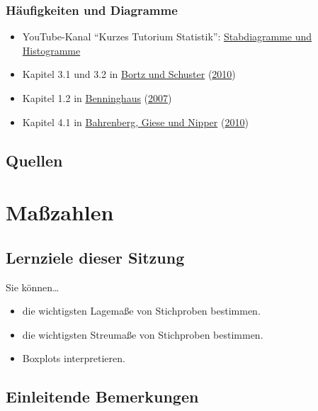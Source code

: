 \documentclass[
  ngerman,
]{article}
\providecommand{\tightlist}{%
  \setlength{\itemsep}{0pt}\setlength{\parskip}{0pt}}
\begin{document}
\hypertarget{huxe4ufigkeiten-und-diagramme}{%
\subsubsection{Häufigkeiten und Diagramme}\label{huxe4ufigkeiten-und-diagramme}}

\begin{itemize}
\tightlist
\item
  YouTube-Kanal ``Kurzes Tutorium Statistik'': \href{https://www.youtube.com/watch?v=LkOBRWXnTRQ}{Stabdiagramme und Histogramme}
\item
  Kapitel 3.1 und 3.2 in \protect\hyperlink{ref-bortz}{Bortz und Schuster} (\protect\hyperlink{ref-bortz}{2010})
\item
  Kapitel 1.2 in \protect\hyperlink{ref-benninghaus}{Benninghaus} (\protect\hyperlink{ref-benninghaus}{2007})
\item
  Kapitel 4.1 in \protect\hyperlink{ref-bahrenberg}{Bahrenberg, Giese und Nipper} (\protect\hyperlink{ref-bahrenberg}{2010})
\end{itemize}

\hypertarget{quellen}{%
\subsection{Quellen}\label{quellen}}

\hypertarget{mauxdfzahlen}{%
\section{Maßzahlen}\label{mauxdfzahlen}}

\hypertarget{lernziele-dieser-sitzung-1}{%
\subsection{Lernziele dieser Sitzung}\label{lernziele-dieser-sitzung-1}}

Sie können\ldots{}

\begin{itemize}
\tightlist
\item
  die wichtigsten Lagemaße von Stichproben bestimmen.
\item
  die wichtigsten Streumaße von Stichproben bestimmen.
\item
  Boxplots interpretieren.
\end{itemize}

\hypertarget{einleitende-bemerkungen}{%
\subsection{Einleitende Bemerkungen}\label{einleitende-bemerkungen}}
\end{document}
